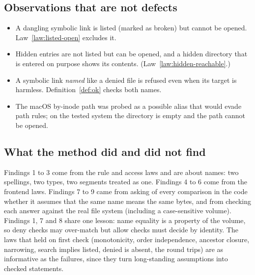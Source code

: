 \subsection{Observations that are not defects}

\begin{itemize}
  \item A dangling symbolic link is listed (marked as broken) but cannot be
        opened.  Law~\ref{law:listed-open} excludes it.
  \item Hidden entries are not listed but can be opened, and a hidden directory
        that is entered on purpose shows its contents.
        (Law~\ref{law:hidden-reachable}.)
  \item A symbolic link \emph{named} like a denied file is refused even when its
        target is harmless.  Definition~\ref{def:ok} checks both names.
  \item The macOS by-inode path  was probed as a
        possible alias that would evade path rules; on the tested system the
        directory is empty and the path cannot be opened.
\end{itemize}

\subsection{What the method did and did not find}

Findings 1 to 3 come from the rule and access laws and are about names: two
spellings, two types, two segments treated as one.  Findings 4 to 6 come from
the frontend laws.  Findings 7 to 9 came from asking of every comparison in the
code whether it assumes that the same name means the same bytes, and from
checking each answer against the real file system (including a case-sensitive
volume).  Findings 1, 7 and 8 share one lesson: name equality is a property of
the volume, so deny checks may over-match but allow checks must decide by
identity.  The laws that held on first check (monotonicity, order
independence, ancestor closure, narrowing, search implies listed, denied is
absent, the round trips) are as informative as the failures, since they turn
long-standing assumptions into checked statements.
